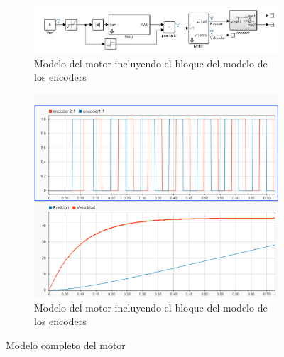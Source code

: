 \documentclass[10pt,a4paper]{report}
\begin{document}
\begin{figure}
\centering
\begin{subfigure}{\textwidth}
\centering
\includegraphics[width=\textwidth]{motor_encoders.jpg}
\caption{Modelo del motor incluyendo el bloque del modelo de los encoders}
\label{f29a}
\end{subfigure}
\begin{subfigure}{\textwidth}
\centering
\includegraphics[scale=0.5]{encoders.png}
\caption{Modelo del motor incluyendo el bloque del modelo de los encoders}
\label{f29b}
\end{subfigure}
\caption{Modelo completo del motor}
\end{figure}
\end{document}
